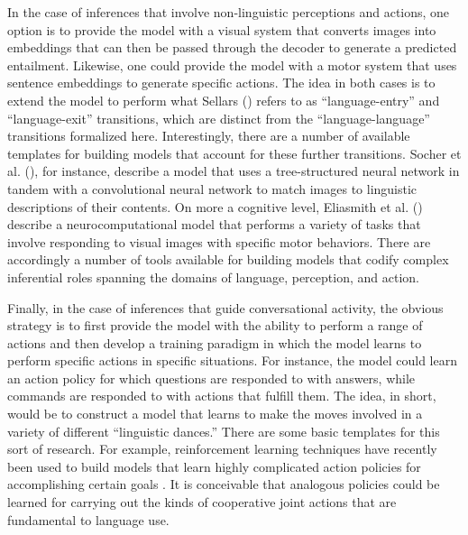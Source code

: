 In the case of inferences that involve non-linguistic perceptions and actions, one option is to provide the model with a visual system that converts images into embeddings that can then be passed through the decoder to generate a predicted entailment. Likewise, one could provide the model with a motor system that uses sentence embeddings to generate specific actions. The idea in both cases is to extend the model to perform what Sellars (\citeyear{Sellars:1954}) refers to as ``language-entry'' and ``language-exit'' transitions, which are distinct from the ``language-language'' transitions formalized here. Interestingly, there are a number of available templates for building models that account for these further transitions. Socher et al. (\citeyear{Socher:2014}), for instance, describe a model that uses a tree-structured neural network in tandem with a convolutional neural network to match images to linguistic descriptions of their contents. On more a cognitive level, Eliasmith et al. (\citeyear{Eliasmith:2012}) describe a neurocomputational model that performs a variety of tasks that involve responding to visual images with specific motor behaviors. There are accordingly a number of tools available for building models that codify complex inferential roles spanning the domains of language, perception, and action. 

Finally, in the case of inferences that guide conversational activity, the obvious strategy is to first provide the model with the ability to perform a range of actions and then develop a training paradigm in which the model learns to perform specific actions in specific situations. For instance, the model could learn an action policy for which questions are responded to with answers, while commands are responded to with actions that fulfill them. The idea, in short, would be to construct a model that learns to make the moves involved in a variety of different ``linguistic dances.'' There are some basic templates for this sort of research. For example, reinforcement learning techniques have recently been used to build models that learn highly complicated action policies for accomplishing certain goals \citep{Mnih:2015}. It is conceivable that analogous policies could be learned for carrying out the kinds of cooperative joint actions that are fundamental to language use.

